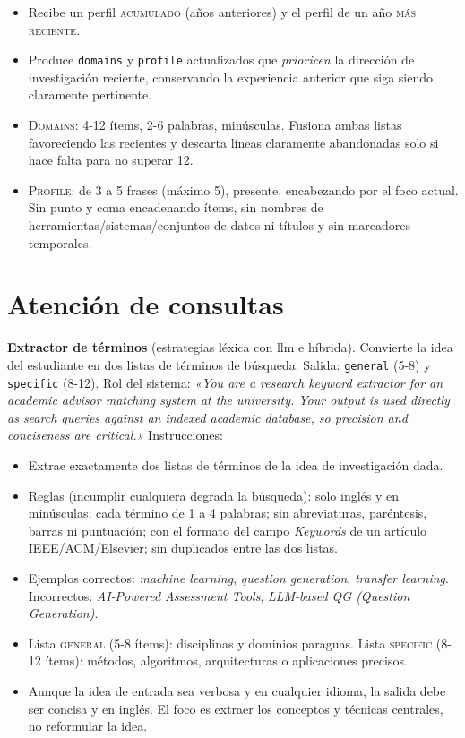 \begin{itemize}[nosep]
    \item Recibe un perfil \textsc{acumulado} (años anteriores) y el perfil de un año \textsc{más reciente}.
    \item Produce \texttt{domains} y \texttt{profile} actualizados que \emph{prioricen} la dirección de investigación reciente, conservando la experiencia anterior que siga siendo claramente pertinente.
    \item \textsc{Domains}: 4-12 ítems, 2-6 palabras, minúsculas.
    Fusiona ambas listas favoreciendo las recientes y descarta líneas claramente abandonadas solo si hace falta para no superar 12.
    \item \textsc{Profile}: de 3 a 5 frases (máximo 5), presente, encabezando por el foco actual.
    Sin punto y coma encadenando ítems, sin nombres de herramientas/sistemas/conjuntos de datos ni títulos y sin marcadores temporales.
\end{itemize}

\section*{Atención de consultas}

\textbf{Extractor de términos} (estrategias léxica con \gls{llm} e híbrida).
Convierte la idea del estudiante en dos listas de términos de búsqueda.
Salida: \texttt{general} (5-8) y \texttt{specific} (8-12).
Rol del sistema: \emph{«You are a research keyword extractor for an academic advisor matching system at the university. Your output is used directly as search queries against an indexed academic database, so precision and conciseness are critical.»}
Instrucciones:

\begin{itemize}[nosep]
    \item Extrae exactamente dos listas de términos de la idea de investigación dada.
    \item Reglas (incumplir cualquiera degrada la búsqueda): solo inglés y en minúsculas; cada término de 1 a 4 palabras; sin abreviaturas, paréntesis, barras ni puntuación; con el formato del campo \emph{Keywords} de un artículo IEEE/ACM/Elsevier; sin duplicados entre las dos listas.
    \item Ejemplos correctos: \emph{machine learning}, \emph{question generation}, \emph{transfer learning}. Incorrectos: \emph{AI-Powered Assessment Tools}, \emph{LLM-based QG (Question Generation)}.
    \item Lista \textsc{general} (5-8 ítems): disciplinas y dominios paraguas.
    Lista \textsc{specific} (8-12 ítems): métodos, algoritmos, arquitecturas o aplicaciones precisos.
    \item Aunque la idea de entrada sea verbosa y en cualquier idioma, la salida debe ser concisa y en inglés.
    El foco es extraer los conceptos y técnicas centrales, no reformular la idea.
\end{itemize}

